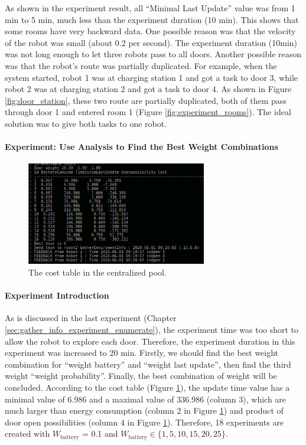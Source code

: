 As shown in the experiment result, all ``Minimal Last Update'' value was from 1 min to 5 min, much less than the experiment duration (10 min). This shows that some rooms have very backward data. One possible reason was that the velocity of the robot was small (about 0.2 per second). The experiment duration (10min) was not long enough to let three robots pass to all doors. Another possible reason was that the robot's route was partially duplicated. For example, when the system started, robot 1 was at charging station 1 and got a task to door 3, while robot 2 was at charging station 2 and got a task to door 4. As shown in Figure \ref{fig:door_station}, these two route are partially duplicated, both of them pass through door 1 and entered room 1 (Figure \ref{fig:experiment_rooms}). The ideal solution was to give both tasks to one robot. 



\paragraph{Experiment: Use Analysis to Find the Best Weight Combinations}

\begin{figure}
 \centering
 \includegraphics[width = 0.7\textwidth]{content/images/ch5/weight_analyze.png}
 \caption{The cost table in the centralized pool.}
 \label{fig:cost_table}
\end{figure}

\paragraph{Experiment Introduction} 
As is discussed in the last experiment (Chapter \ref{sec:gather_info_experiment_enumerate}), the experiment time was too short to allow the robot to explore each door. Therefore, the experiment duration in this experiment was increased to 20 min.
Firstly, we should find the best weight combination for ``weight battery'' and ``weight last update'', then find the third weight ``weight probability''. Finally, the best combination of weight will be concluded.
 According to the cost table (Figure \ref{fig:cost_table}), the update time value has a minimal value of 6.986 and a maximal value of 336.986 (column 3), which are much larger than energy consumption (column 2 in Figure \ref{fig:cost_table}) and product of door open possibilities (column 4 in Figure \ref{fig:cost_table}).
 Therefore, 18 experiments are created with $W_{\mbox{battery}}$
 = 0.1 and $W_{\mbox{battery}} \in \{1,5,10,15,20,25 \}$.


